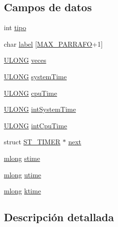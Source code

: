 \subsection*{Campos de datos}
\begin{DoxyCompactItemize}
\item 
int \hyperlink{struct_s_t___t_i_m_e_r_a913ffe6a1b92facf1adf87d5190445bc}{tipo}
\item 
char \hyperlink{struct_s_t___t_i_m_e_r_aa62a205ca9e35b3b88632d2ec557a5a0}{label} \mbox{[}\hyperlink{sdpconfig_8h_ac084a897234f41c71f01eab1d39c3073}{M\+A\+X\+\_\+\+P\+A\+R\+R\+A\+F\+O}+1\mbox{]}
\item 
\hyperlink{sdp_types_8h_af632da489ebc3708ec3ab6791ee53fa4}{U\+L\+O\+N\+G} \hyperlink{struct_s_t___t_i_m_e_r_a23a3531ed93eb7f069a5f33ee77d7ca8}{veces}
\item 
\hyperlink{sdp_types_8h_af632da489ebc3708ec3ab6791ee53fa4}{U\+L\+O\+N\+G} \hyperlink{struct_s_t___t_i_m_e_r_a9ff17a87e2d5c2c20efd3883fc5e8afd}{system\+Time}
\item 
\hyperlink{sdp_types_8h_af632da489ebc3708ec3ab6791ee53fa4}{U\+L\+O\+N\+G} \hyperlink{struct_s_t___t_i_m_e_r_ae4c31cb2b4477be7ae2f947073b3d770}{cpu\+Time}
\item 
\hyperlink{sdp_types_8h_af632da489ebc3708ec3ab6791ee53fa4}{U\+L\+O\+N\+G} \hyperlink{struct_s_t___t_i_m_e_r_a8c0fad2befd4574e6a7fae46124d5339}{int\+System\+Time}
\item 
\hyperlink{sdp_types_8h_af632da489ebc3708ec3ab6791ee53fa4}{U\+L\+O\+N\+G} \hyperlink{struct_s_t___t_i_m_e_r_a61dff6fa53638f76ef2f5c004a58992b}{int\+Cpu\+Time}
\item 
struct \hyperlink{struct_s_t___t_i_m_e_r}{S\+T\+\_\+\+T\+I\+M\+E\+R} $\ast$ \hyperlink{struct_s_t___t_i_m_e_r_ae1e8a4a6b208f964f72c50f97e978978}{next}
\item 
\hyperlink{token_8h_acb3d64ed2bb2e72ebb17ca4ef85ae6d3}{mlong} \hyperlink{struct_s_t___t_i_m_e_r_ab93a9231acb19c595671938b5b322772}{stime}
\item 
\hyperlink{token_8h_acb3d64ed2bb2e72ebb17ca4ef85ae6d3}{mlong} \hyperlink{struct_s_t___t_i_m_e_r_a74777a0ada04040a1c53c70c83a06a4e}{utime}
\item 
\hyperlink{token_8h_acb3d64ed2bb2e72ebb17ca4ef85ae6d3}{mlong} \hyperlink{struct_s_t___t_i_m_e_r_a4296c1722751cfeaf3d52cedf2bc212b}{ktime}
\end{DoxyCompactItemize}


\subsection{Descripción detallada}


